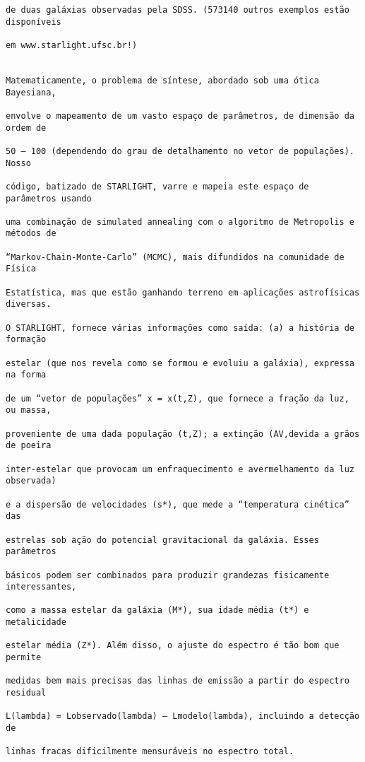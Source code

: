 \begin{verbatim}
de duas galáxias observadas pela SDSS. (573140 outros exemplos estão disponíveis

em www.starlight.ufsc.br!)


Matematicamente, o problema de síntese, abordado sob uma ótica Bayesiana,

envolve o mapeamento de um vasto espaço de parâmetros, de dimensão da ordem de

50 – 100 (dependendo do grau de detalhamento no vetor de populações).  Nosso

código, batizado de STARLIGHT, varre e mapeia este espaço de parâmetros usando

uma combinação de simulated annealing com o algoritmo de Metropolis e métodos de

“Markov-Chain-Monte-Carlo” (MCMC), mais difundidos na comunidade de Física

Estatística, mas que estão ganhando terreno em aplicações astrofísicas diversas.

O STARLIGHT, fornece várias informações como saída: (a) a história de formação

estelar (que nos revela como se formou e evoluiu a galáxia), expressa na forma

de um “vetor de populações” x = x(t,Z), que fornece a fração da luz, ou massa,

proveniente de uma dada população (t,Z); a extinção (AV,devida a grãos de poeira

inter-estelar que provocam um enfraquecimento e avermelhamento da luz observada)

e a dispersão de velocidades (s*), que mede a “temperatura cinética” das

estrelas sob ação do potencial gravitacional da galáxia. Esses parâmetros

básicos podem ser combinados para produzir grandezas fisicamente interessantes,

como a massa estelar da galáxia (M*), sua idade média (t*) e metalicidade

estelar média (Z*). Além disso, o ajuste do espectro é tão bom que permite

medidas bem mais precisas das linhas de emissão a partir do espectro residual

L(lambda) = Lobservado(lambda) – Lmodelo(lambda), incluindo a detecção de

linhas fracas dificilmente mensuráveis no espectro total.

\end{verbatim}


